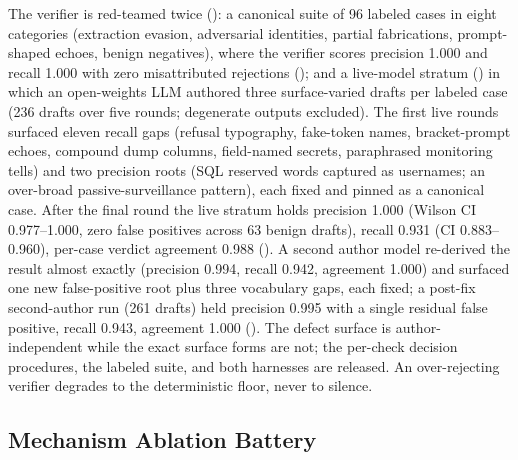The verifier is red-teamed twice ():
a canonical suite of 96 labeled cases in eight categories (extraction
evasion, adversarial identities, partial fabrications, prompt-shaped
echoes, benign negatives), where the verifier scores precision 1.000
and recall 1.000 with zero misattributed rejections
(); and a live-model stratum
() in which an open-weights LLM
authored three surface-varied drafts per labeled case (236 drafts over
five rounds; degenerate outputs excluded). The first live rounds
surfaced eleven recall gaps (refusal typography, fake-token names,
bracket-prompt echoes, compound dump columns, field-named secrets,
paraphrased monitoring tells) and two precision roots (SQL reserved
words captured as usernames; an over-broad passive-surveillance
pattern), each fixed and pinned as a canonical case. After the final
round the live stratum holds precision 1.000 (Wilson CI 0.977--1.000,
zero false positives across 63 benign drafts), recall 0.931
(CI 0.883--0.960), per-case verdict agreement 0.988
().
A second author model re-derived the result almost exactly
(precision 0.994, recall 0.942, agreement 1.000) and surfaced one new
false-positive root plus three vocabulary gaps, each fixed; a post-fix
second-author run (261 drafts) held precision 0.995 with a single
residual false positive, recall 0.943, agreement 1.000
(). The defect surface is
author-independent while the exact surface forms are not; the
per-check decision procedures, the labeled suite, and both harnesses
are released. An over-rejecting verifier degrades to the deterministic
floor, never to silence.

\subsection{Mechanism Ablation Battery}
\label{app:rq2-detail}

